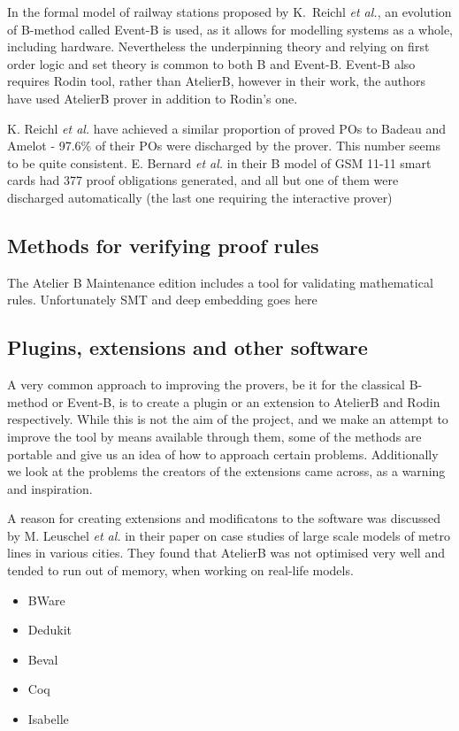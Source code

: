 \documentclass[11pt,journal]{IEEEtran}
\begin{document}
	In the formal model of railway stations proposed by K.~Reichl \emph{et al.}\cite{Railway routing}, an evolution of B-method called Event-B is used, as it allows for modelling systems as a whole, including hardware. Nevertheless the underpinning theory and relying on first order logic and set theory is common to both B and Event-B. Event-B also requires Rodin tool, rather than AtelierB, however in their work, the authors have used AtelierB prover in addition to Rodin's one.
	
	K. Reichl \emph{et al.} have achieved a similar proportion of proved POs to Badeau and Amelot - 97.6\% of their POs were discharged  by the prover. This number seems to be quite consistent. E. Bernard \emph{et al.} in their B model of GSM 11-11 smart cards had 377 proof obligations generated, and all but one of them were discharged automatically (the last one requiring the interactive prover)\cite{GSM}
	
	
	\subsection{Methods for verifying proof rules}
	The Atelier B Maintenance edition includes a tool for validating mathematical rules. Unfortunately
	SMT and deep embedding goes here
	
	\subsection{Plugins, extensions and other software}
	
	A very common approach to improving the provers, be it for the classical B-method or Event-B, is to create a plugin or an extension to AtelierB and Rodin respectively. While this is not the aim of the project, and we make an attempt to improve the tool by means available through them, some of the methods are portable and give us an idea of how to approach certain problems. Additionally we look at the problems the creators of the extensions came across, as a warning and inspiration.
	
	A reason for creating extensions and modificatons to the software was discussed by M. Leuschel \emph{et al.} in their paper on case studies of large scale models of metro lines in various cities\cite{San Juan metro}. They found that AtelierB was not optimised very well and tended to run out of memory, when working on real-life models.
	
	\begin{itemize}
		\item BWare
		\item Dedukit
		\item Beval
		\item Coq
		\item Isabelle
	\end{itemize}
\end{document}
